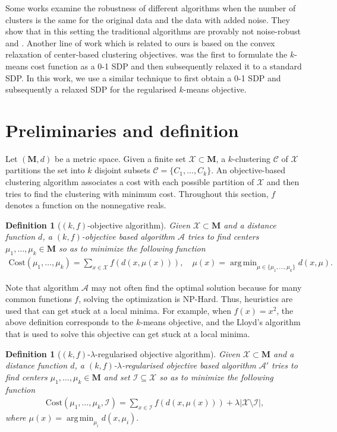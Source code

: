 \documentclass[12pt]{article}
\newcommand{\mc}{\mathcal}
\newcommand{\mb}{\mathbf}
\DeclareMathOperator*{\argmin}{arg\,min}
\newtheorem{definition}[theorem]{Definition}
\begin{document}
Some works examine the robustness of different algorithms when the number of clusters is the same for the original data and the data with added noise. They show that in this setting the traditional algorithms are provably not noise-robust \cite{hennig2008dissolution} and \cite{ackerman2013clustering}. Another line of work which is related to ours is based on the convex relaxation of center-based clustering objectives. \cite{peng2007approximating} was the first to formulate the $k$-means cost function as a 0-1 SDP and then subsequently relaxed it to a standard SDP. In this work, we use a similar technique to first obtain a 0-1 SDP and subsequently a relaxed SDP for the regularised $k$-means objective. 

\section{Preliminaries and definition}
\label{sec:pre}

Let $(\mb M, d)$ be a metric space. Given a finite set $\mc X \subset \mb M$, a $k$-clustering $\mc C$ of $\mc X$ partitions the set into $k$ disjoint subsets $\mc C = \{C_1, \ldots, C_k\}$. An objective-based clustering algorithm associates a cost with each possible partition of $\mc X$ and then tries to find the clustering with minimum cost. Throughout this section, $f$ denotes a function on the nonnegative reals.

\begin{definition}[$(k, f)$-objective algorithm] Given $\mc X\subset \mb M$ and a distance function $d$, a $(k, f)$-objective based algorithm $\mc A$ tries to find centers $\mu_1, \ldots, \mu_k \in \mb M$ so as to minimize the following function
\begin{align}
\label{eqn:kfObjectiveAlg}
\text{Cost}(\mu_1, \ldots, \mu_k) = \sum_{x\in \mc X} f(d(x, \mu(x))), \quad \mu(x) = \argmin_{\mu \in \{\mu_1, \ldots, \mu_k\}} d(x, \mu).
\end{align}
\end{definition}
Note that algorithm $\mc A$ may not often find the optimal solution because for many common functions $f$, solving the optimization is NP-Hard. Thus, heuristics are used that can get stuck at a local minima. For example, when $f(x) = x^2$, the above definition corresponds to the $k$-means objective, and the Lloyd's algorithm that is used to solve this objective can get stuck at a local minima. 

\begin{definition}[$(k, f)$-$\lambda$-regularised objective algorithm] Given $\mc X\subset \mb M$ and a distance function $d$, a $(k, f)$-$\lambda$-regularised objective based algorithm $\mc A'$ tries to find centers $\mu_1, \ldots, \mu_k \in \mb M$ and set $\mc I\subseteq \mc X$ so as to minimize the following function
\begin{align}
\label{eqn:kfObjectiveAlg}
\text{Cost}(\mu_1, \ldots, \mu_k, \mc I) = \sum_{x\in \mc I} f(d(x, \mu(x))) + \lambda |\mc X \setminus \mc I|,
\end{align}
where $\mu(x) = \argmin_{\mu_i} d(x, \mu_i).$
\end{definition}
\end{document}
